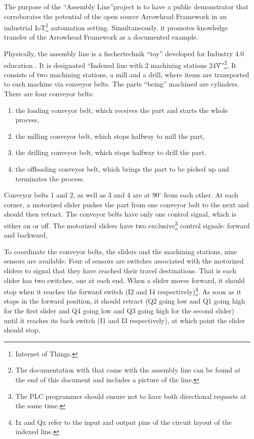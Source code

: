 The purpose of the ``Assembly Line''project is to have a public demonstrator that corroborates the potential of the open source Arrowhead Framework in an industrial IoT\footnote{Internet of Things.} automation setting.
Simultaneously, it  promotes knowledge transfer of the Arrowhead Framework as a documented example.

Physically, the assembly line is a fischertechnik ``toy'' developed for Industry 4.0 education \cite{fischertechnik}.
It is designated ``Indexed line with 2 machining stations 24\~V''\footnote{The documentation with that came with the assembly line can be found at the end of this document and includes a picture of the line.}.
It consists of two machining stations, a mill and a drill, where items are transported to each machine via conveyor belts.
The parts ``being'' machined are cylinders.
There are four conveyor belts:
\begin{enumerate}
 \item the loading conveyor belt, which receives the part and starts the whole process,
 \item the milling conveyor belt, which stops halfway to mill the part,
 \item the drilling conveyor belt, which stops halfway to drill the part.
 \item the offloading conveyor belt, which brings the part to be picked up and terminates the process.
\end{enumerate}
Conveyor belts 1 and 2, as well as 3 and 4 are at 90$^\circ$ from each other.
At each corner, a motorized slider pushes the part from one conveyor belt to the next and should then retract.
The conveyor belts have only one control signal, which is either on or off.
The motorized sliders have two exclusive\footnote{The PLC programmer should ensure not to have both directional requests at the same time.}  control signals: forward and backward,

To coordinate the conveyor belts, the sliders and the machining stations, nine sensors are available.
Four of sensors are switches associated with the motorized sliders to signal that they have reached their travel destinations.
That is each slider has two switches, one at each end.
When a slider moves forward, it should stop when it reaches the forward switch (I2 and I4 respectively)\footnote{Ix and Qx refer to the input and output pins of the circuit layout of the indexed line.}.
As soon as it stops in the forward position, it should retract (Q2 going low and Q1 going high for the first slider and Q4 going low and Q3 going high for the second slider) until it reaches its back switch (I1 and I3 respectively), at which point the slider should stop.
 
